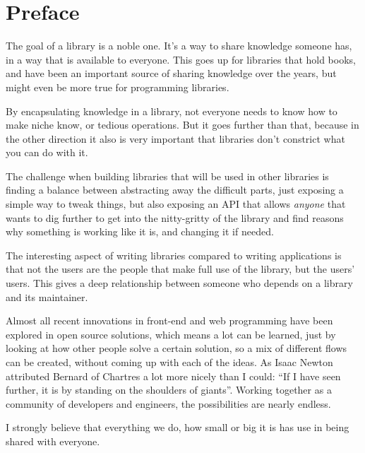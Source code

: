 
\chapter{Preface}%
\label{chp:preface}

The goal of a library is a noble one. It's a way to share knowledge someone has, in a way that is available to everyone. This goes up for libraries that hold books, and have been an important source of sharing knowledge over the years, but might even be more true for programming libraries. 

By encapsulating knowledge in a library, not everyone needs to know how to make niche know, or tedious operations. But it goes further than that, because in the other direction it also is very important that libraries don't constrict what you can do with it.

The challenge when building libraries that will be used in other libraries is finding a balance between abstracting away the difficult parts, just exposing a simple way to tweak things, but also exposing an API that allows \emph{anyone} that wants to dig further to get into the nitty-gritty of the library and find reasons why something is working like it is, and changing it if needed.

The interesting aspect of writing libraries compared to writing applications is that not the users are the people that make full use of the library, but the users' users. This gives a deep relationship between someone who depends on a library and its maintainer.

Almost all recent innovations in front-end and web programming have been explored in open source solutions, which means a lot can be learned, just by looking at how other people solve a certain solution, so a mix of different flows can be created, without coming up with each of the ideas. As Isaac Newton attributed Bernard of Chartres\cite{quote-giants-source} a lot more nicely than I could: ``If I have seen further, it is by standing on the shoulders of giants''. Working together as a community of developers and engineers, the possibilities are nearly endless.

I strongly believe that everything we do, how small or big it is has use in being shared with everyone.

